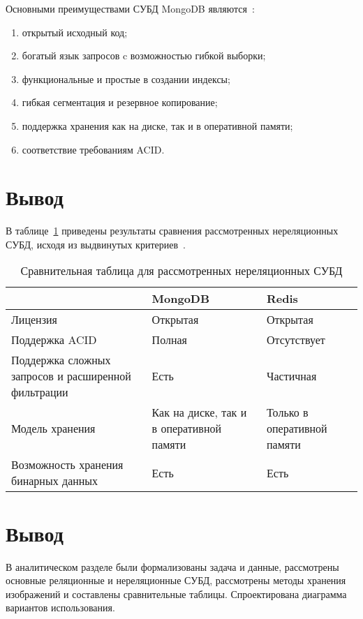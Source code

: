 Основными преимуществами СУБД MongoDB являются~\cite{cmpNosql1}:
\begin{enumerate}
	\item открытый исходный код;
	\item богатый язык запросов c возможностью гибкой выборки;
	\item функциональные и простые в создании индексы;
	\item гибкая сегментация и резервное копирование;
	\item поддержка хранения как на диске, так и в оперативной памяти;
	\item соответствие требованиям ACID.
\end{enumerate}

\section*{Вывод}

В таблице~\ref{table:compareNoSQLDBs} приведены результаты сравнения рассмотренных нереляционных СУБД, исходя из выдвинутых критериев~\cite{cmpNosql1}.
\begin{table}[h!]
	\begin{center}
		\caption{\label{table:compareNoSQLDBs} Сравнительная таблица для рассмотренных нереляционных СУБД}
		\begin{tabularx}{\textwidth}{|X|X|X|}
			\hline
			~ & MongoDB & Redis \\ \hline
			Лицензия & Открытая & Открытая \\ \hline
			Поддержка ACID & Полная & Отсутствует \\ \hline
			Поддержка сложных запросов и расширенной фильтрации & Есть & Частичная \\ \hline
			Модель хранения & Как на диске, так и в оперативной памяти & Только в оперативной памяти \\ \hline
			Возможность хранения бинарных данных & Есть & Есть \\ \hline
		\end{tabularx}
	\end{center}
\end{table}

\section{Вывод}

В аналитическом разделе были формализованы задача и данные, рассмотрены основные реляционные и нереляционные СУБД, рассмотрены методы хранения изображений и составлены сравнительные таблицы. Спроектирована диаграмма вариантов использования.


